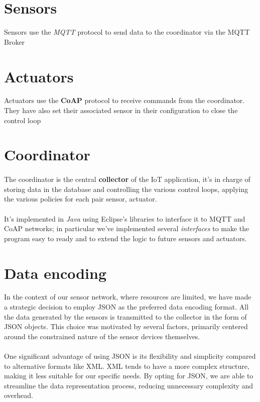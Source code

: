 \documentclass[parskip=full]{report}
\begin{document}
\section{Sensors}

Sensors use the \textit{MQTT} protocol to send data to the coordinator via the MQTT Broker

\section{Actuators}
Actuators use the \textbf{CoAP} protocol to receive commands from the coordinator. They have also set their associated sensor in their configuration to close the control loop

\section{Coordinator}

\paragraph{}
The coordinator is the central \textbf{collector} of the IoT application, it's in charge of storing data in the database and controlling the various control loops, applying the various policies for each pair sensor, actuator.

\paragraph{}
It's implemented in \textit{Java} using Eclipse's libraries to interface it to MQTT and CoAP networks; in particular we've implemented several \textit{interfaces} to make the program easy to ready and to extend the logic to future sensors and actuators.



\section{Data encoding}

In the context of our sensor network, where resources are limited, we have made a strategic decision to employ JSON as the preferred data encoding format. All the data generated by the sensors is transmitted to the collector in the form of JSON objects. This choice was motivated by several factors, primarily centered around the constrained nature of the sensor devices themselves.
\paragraph{}
One significant advantage of using JSON is its flexibility and simplicity compared to alternative formats like XML. XML tends to have a more complex structure, making it less suitable for our specific needs. By opting for JSON, we are able to streamline the data representation process, reducing unnecessary complexity and overhead.
\end{document}
